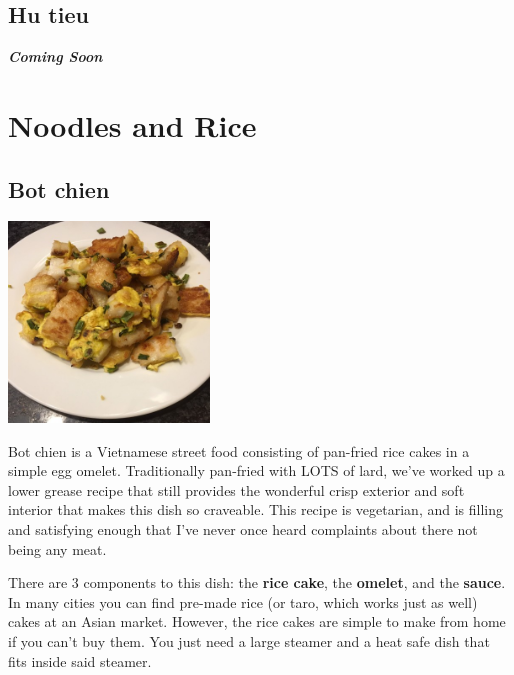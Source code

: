 \documentclass[
]{book}
\begin{document}
\begin{blackbox}
\end{blackbox}

\hypertarget{hutieu}{%
\subsection*{Hu tieu}\label{hutieu}}

\textbf{\emph{Coming Soon}}

\hypertarget{noodles-and-rice}{%
\section*{Noodles and Rice}\label{noodles-and-rice}}

\hypertarget{botchien}{%
\subsection*{Bot chien}\label{botchien}}

\includegraphics[width=0.4\textwidth,height=\textheight]{bot_chien_small.jpg}

Bot chien is a Vietnamese street food consisting of pan-fried rice cakes in a simple egg omelet. Traditionally pan-fried with LOTS of lard, we've worked up a lower grease recipe that still provides the wonderful crisp exterior and soft interior that makes this dish so craveable. This recipe is vegetarian, and is filling and satisfying enough that I've never once heard complaints about there not being any meat.

There are 3 components to this dish: the \textbf{rice cake}, the \textbf{omelet}, and the \textbf{sauce}. In many cities you can find pre-made rice (or taro, which works just as well) cakes at an Asian market. However, the rice cakes are simple to make from home if you can't buy them. You just need a large steamer and a heat safe dish that fits inside said steamer.
\end{document}
